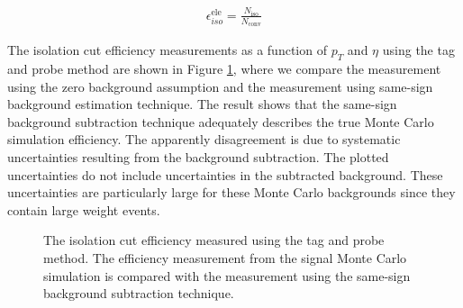 \documentclass{cmspaper}
\begin{document}
\begin{eqnarray}
  \label{eqn:electronIsolationEfficiency}  
  \epsilon_{iso}^{\mathrm{ele}} = \frac{N_{\mathrm{iso}}}{N_{\mathrm{conv}}}
\end{eqnarray}

The isolation cut efficiency measurements as a function of $p_{T}$ and $\eta$ using the tag and probe method are shown in Figure \ref{eleIsoCutEfficiency_TagAndProbe}, where we compare the measurement using the zero background assumption and the measurement using same-sign background estimation technique. The result shows that the same-sign background subtraction technique adequately describes the true Monte Carlo simulation efficiency. The apparently disagreement is due to systematic uncertainties resulting from the background subtraction. The plotted uncertainties do not include uncertainties in the subtracted background. These uncertainties are particularly large for these Monte Carlo backgrounds since they contain large weight events.  

\begin{figure}[htb]
  \begin{center}
    \caption{The isolation cut efficiency measured using the tag and probe method. The efficiency measurement from the signal Monte Carlo simulation is compared with the measurement using the same-sign background subtraction technique. }
    \label{eleIsoCutEfficiency_TagAndProbe}
  \end{center}
\end{figure}
\end{document}
